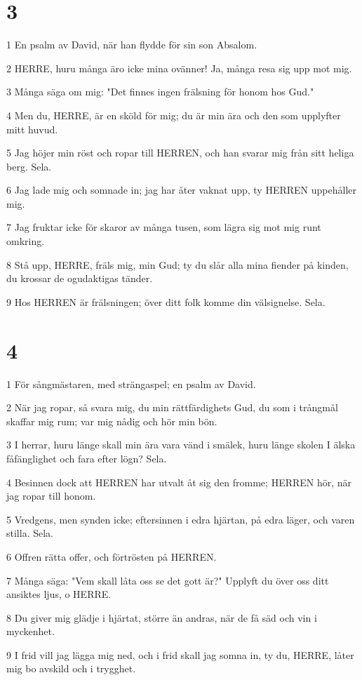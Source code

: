 \chapter{3}

\par 1 En psalm av David, när han flydde för sin son Absalom.
\par 2 HERRE, huru många äro icke mina ovänner! Ja, många resa sig upp mot mig.
\par 3 Många säga om mig: "Det finnes ingen frälsning för honom hos Gud."
\par 4 Men du, HERRE, är en sköld för mig; du är min ära och den som upplyfter mitt huvud.
\par 5 Jag höjer min röst och ropar till HERREN, och han svarar mig från sitt heliga berg. Sela.
\par 6 Jag lade mig och somnade in; jag har åter vaknat upp, ty HERREN uppehåller mig.
\par 7 Jag fruktar icke för skaror av många tusen, som lägra sig mot mig runt omkring.
\par 8 Stå upp, HERRE, fräls mig, min Gud; ty du slår alla mina fiender på kinden, du krossar de ogudaktigas tänder.
\par 9 Hos HERREN är frälsningen; över ditt folk komme din välsignelse. Sela.

\chapter{4}

\par 1 För sångmästaren, med strängaspel; en psalm av David.
\par 2 När jag ropar, så svara mig, du min rättfärdighets Gud, du som i trångmål skaffar mig rum; var mig nådig och hör min bön.
\par 3 I herrar, huru länge skall min ära vara vänd i smälek, huru länge skolen I älska fåfänglighet och fara efter lögn? Sela.
\par 4 Besinnen dock att HERREN har utvalt åt sig den fromme; HERREN hör, när jag ropar till honom.
\par 5 Vredgens, men synden icke; eftersinnen i edra hjärtan, på edra läger, och varen stilla. Sela.
\par 6 Offren rätta offer, och förtrösten på HERREN.
\par 7 Många säga: "Vem skall låta oss se det gott är?" Upplyft du över oss ditt ansiktes ljus, o HERRE.
\par 8 Du giver mig glädje i hjärtat, större än andras, när de få säd och vin i myckenhet.
\par 9 I frid vill jag lägga mig ned, och i frid skall jag somna in, ty du, HERRE, låter mig bo avskild och i trygghet.

